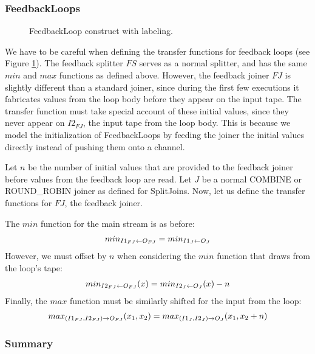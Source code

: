 \subsubsection{FeedbackLoops}

\begin{figure}
\centering
{}
\caption{\protect\small  FeedbackLoop construct with labeling.
\protect\label{looplabel}}
\end{figure}

We have to be careful when defining the transfer functions for
feedback loops (see Figure \ref{looplabel}).  The feedback splitter
$FS$ serves as a normal splitter, and has the same $min$ and $max$
functions as defined above.  However, the feedback joiner $FJ$ is
slightly different than a standard joiner, since during the first few
executions it fabricates values from the loop body before they appear
on the input tape.  The transfer function must take special account of
these initial values, since they never appear on $I2_{FJ}$, the input
tape from the loop body.  This is because we model the initialization
of FeedbackLoops by feeding the joiner the initial values directly
instead of pushing them onto a channel.

Let $n$ be the number of initial values that are provided to the
feedback joiner before values from the feedback loop are read.  Let
$J$ be a normal COMBINE or ROUND\_ROBIN joiner as defined for
SplitJoins.  Now, let us define the transfer functions for $FJ$, the
feedback joiner.

The $min$ function for the main stream is as before:
\begin{eqnarray*}
min_{I1_{FJ} \leftarrow O_{FJ}} = min_{I1_J \leftarrow O_J} 
\end{eqnarray*}
However, we must offset by $n$ when considering the $min$ function
that draws from the loop's tape:
\begin{eqnarray*}
min_{I2_{FJ} \leftarrow O_{FJ}}(x) = min_{I2_J \leftarrow O_J}(x) - n
\end{eqnarray*}
Finally, the $max$ function must be similarly shifted for the input
from the loop:
\begin{eqnarray*}
max_{(I1_{FJ}, I2_{FJ}) \rightarrow O_{FJ}}(x_1, x_2) = max_{(I1_J, I2_J) \rightarrow O_J}(x_1,
x_2 + n)
\end{eqnarray*}

\subsubsection{Summary}

